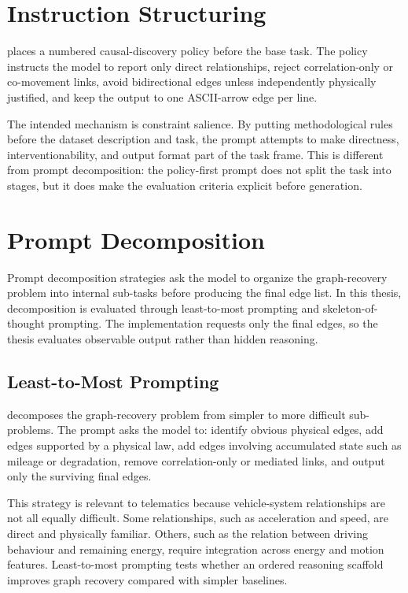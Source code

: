 \section{Instruction Structuring}

 places a numbered
causal-discovery policy before the base task. The policy instructs the model
to report only direct relationships, reject correlation-only or co-movement
links, avoid bidirectional edges unless independently physically justified,
and keep the output to one ASCII-arrow edge per line.

The intended mechanism is constraint salience. By putting methodological rules
before the dataset description and task, the prompt attempts to make
directness, interventionability, and output format part of the task frame.
This is different from prompt decomposition: the policy-first prompt does not
split the task into stages, but it does make the evaluation criteria explicit
before generation.

\section{Prompt Decomposition}

Prompt decomposition strategies ask the model to organize the graph-recovery
problem into internal sub-tasks before producing the final edge list. In this
thesis, decomposition is evaluated through least-to-most prompting and
skeleton-of-thought prompting. The implementation requests only the final
edges, so the thesis evaluates observable output rather than hidden reasoning.

\subsection{Least-to-Most Prompting}

 decomposes the graph-recovery problem
from simpler to more difficult sub-problems. The prompt asks the model to:
identify obvious physical edges, add edges supported by a physical law, add
edges involving accumulated state such as mileage or degradation, remove
correlation-only or mediated links, and output only the surviving final edges.

This strategy is relevant to telematics because vehicle-system relationships
are not all equally difficult. Some relationships, such as acceleration and
speed, are direct and physically familiar. Others, such as the relation
between driving behaviour and remaining energy, require integration across
energy and motion features. Least-to-most prompting tests whether an ordered
reasoning scaffold improves graph recovery compared with simpler baselines.

